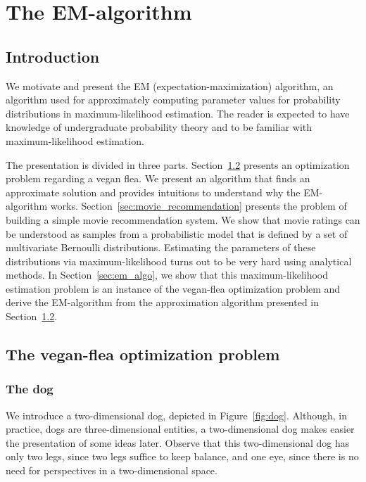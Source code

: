 \chapter{The EM-algorithm}

\section{Introduction}

We motivate and present the EM (expectation-maximization) algorithm, an algorithm used for approximately computing parameter values for probability distributions in maximum-likelihood estimation. The reader is expected to have knowledge of undergraduate probability theory and to be familiar with maximum-likelihood estimation.

The presentation is divided in three parts. Section~\ref{sec:vegan_flea} presents an optimization problem regarding a vegan flea. We present an algorithm that finds an approximate solution and provides intuitions to understand why the EM-algorithm works. Section~\ref{sec:movie_recommendation} presents the problem of building a simple movie recommendation system. We show that movie ratings can be understood as samples from a probabilistic model that is defined by a set of multivariate Bernoulli distributions. Estimating the parameters of these distributions via maximum-likelihood turns out to be very hard using analytical methods. In Section~\ref{sec:em_algo}, we show that this maximum-likelihood estimation problem is an instance of the vegan-flea optimization problem and derive the EM-algorithm from the approximation algorithm presented in Section~\ref{sec:vegan_flea}.

\section{The vegan-flea optimization problem}
\label{sec:vegan_flea}

\subsection{The dog}

We introduce a two-dimensional dog, depicted in Figure~\ref{fig:dog}. Although, in practice, dogs are three-dimensional entities, a two-dimensional dog makes easier the presentation of some ideas later. Observe that this two-dimensional dog has only two legs, since two legs suffice to keep balance, and one eye, since there is no need for perspectives in a two-dimensional space. 

